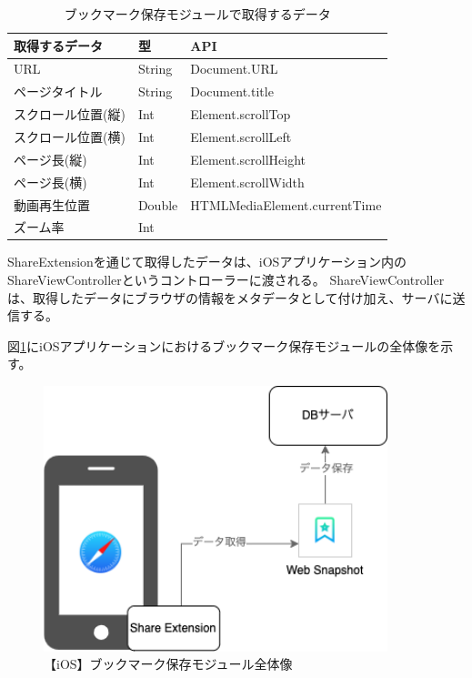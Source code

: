 \begin{table}[htbp]
  \label{tb:impl-ios-data-js-api}
  \caption{ブックマーク保存モジュールで取得するデータ}
  \begin{center}
    \begin{tabular}{|l|l|l|}
    \hline
    取得するデータ & 型 & API \\ \hline
    URL & String & Document.URL \\ \hline
    ページタイトル & String & Document.title \\ \hline
    スクロール位置(縦) & Int & Element.scrollTop \\ \hline
    スクロール位置(横) & Int & Element.scrollLeft \\ \hline
    ページ長(縦) & Int & Element.scrollHeight \\ \hline
    ページ長(横) & Int & Element.scrollWidth \\ \hline
    動画再生位置 & Double & HTMLMediaElement.currentTime \\ \hline
    ズーム率 & Int &  \\ \hline
    \end{tabular}
  \end{center}
\end{table}

ShareExtensionを通じて取得したデータは、iOSアプリケーション内のShareViewControllerというコントローラーに渡される。
ShareViewControllerは、取得したデータにブラウザの情報をメタデータとして付け加え、サーバに送信する。

図\ref{fig:impl-ios-bookmark-save-module}にiOSアプリケーションにおけるブックマーク保存モジュールの全体像を示す。

\begin{figure}[htbp]
  \caption{【iOS】ブックマーク保存モジュール全体像}
  \label{fig:impl-ios-bookmark-save-module}
  \begin{center}
    \includegraphics[bb=0 0 351 271,width=10cm]{img/050_implementation/ios/impl-ios-bookmark-save-module.pdf}
  \end{center}
\end{figure}

